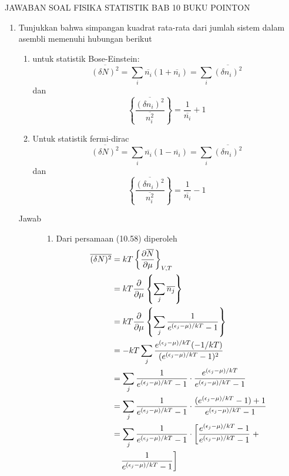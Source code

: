 \documentclass[a4paper , 12 pt]{article}
\begin{document}
\centering
JAWABAN SOAL FISIKA  STATISTIK BAB 10 BUKU POINTON 

\begin{enumerate}
\item
	Tunjukkan bahwa  simpangan kuadrat rata-rata dari jumlah 	sistem dalam asembli  memenuhi hubungan berikut
	\begin{enumerate}
	\item untuk statistik Bose-Einstein:
	\[
	\overline{(\delta N)^2} = \sum_i \overline{n_i} (1+ \overline{n_i}) = \sum_i \overline{(\delta n_i )^2}
	\]
	dan 
	\[
	\left \{ \frac{\overline{(\delta n_i)^2}}{\overline{n_i^2}} \right\}= \frac{1}{\overline{n_i}} +1
	\]
	\item Untuk statistik fermi-dirac
	\[
	\overline{(\delta N)^2} = \sum_i \overline{n_i} (1- \overline{n_i}) = \sum_i \overline{(\delta n_i )^2}
	\]
	dan 
	\[
	\left \{ \frac{\overline{(\delta n_i)^2}}{\overline{n_i^2}} \right\}=\frac{1}{\overline{n_i}} - 1
	\]
	\end{enumerate}
	\begin{description}
	\item [Jawab]
	\begin{enumerate}
	\item
		Dari persamaan (10.58) diperoleh
		\begin{align}
		\overline{(\delta N)^2} &  = kT \left \{ \frac{\partial \overline{N}}{\partial \mu } \right \}_{V,T} \nonumber \\
		& = k T \frac{\partial}{\partial \mu} \left \{ \sum_j \overline{n_j} \right  \} \nonumber \\
		& = kT \frac{\partial }{\partial \mu } \left \{ 
		\sum_j \frac{1}{e^{(\epsilon_j -\mu)/kT} - 1}\right  \} \nonumber \\
		& = - kT \sum_j \frac{e^{(\epsilon_j - \mu)/ kT}(-1/kT)}{(e^{(\epsilon_j -\mu)/kT} - 1)^2} \nonumber \\
		& = \sum_j \frac{1}{e^{(\epsilon_j - \mu)/kT} -1} \cdot \frac{e^{(\epsilon_j - \mu)/kT}}{e^{(\epsilon_j - \mu)/kT }-1} \nonumber \\
		& =  \sum_j \frac{1}{e^{(\epsilon_j - \mu)/kT} -1} \cdot  \frac{(e^{(\epsilon_j - \mu)/kT} -1)+1}{e^{(\epsilon_j - \mu)/kT }-1} \nonumber \\
		& =   \sum_j \frac{1}{e^{(\epsilon_j - \mu)/kT} -1} \cdot  \left[ \frac{e^{(\epsilon_j - \mu)/kT }-1}{e^{(\epsilon_j - \mu)/kT }-1} \right. + \nonumber \\  & \hspace{0.3 cm} \left. \frac{1}{e^{(\epsilon_j - \mu)/kT }-1} \right ] 

\end{align}
\end{enumerate}
\end{description}
\end{enumerate}
\end{document}
